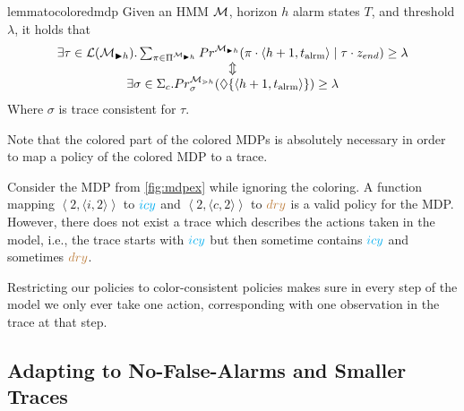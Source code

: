 \documentclass[runningheads]{llncs}
\newcommand{\talrm}{t_{\text{alrm}}}
\newcommand{\icy}{{\color{cyan} icy}\xspace}
\newcommand{\dry}{{\color{brown} dry}\xspace}
\newcommand{\en}{z_{\color{black} end}\xspace}
\newcommand{\alarms}[1][h+1]{\left\langle #1, \talrm\right\rangle}
\newcommand{\ccSched}{\Sigma_c}
\begin{document}
\begin{restatable}{lemma}{tocoloredmdp}
    \label{lem:tocoloredmdp}
    Given an HMM $\mathcal{M}$, horizon $h$ alarm states $T$, and threshold $\lambda$, it holds that
    \vspace{-.1cm}
    \[
        \begin{array}{c}
            \exists \tau \in \lang{\mc_{\blacktriangleright h}}. \sum_{\pi\in\Pi^{\mc_{\blacktriangleright h}}}\Prob^{\mc_{\blacktriangleright h}}(\pi \cdot \alarms \mid \tau \cdot \en) \geq \lambda \\
            \Updownarrow                                                                                                                                                                               \\
            \exists \sigma \in \ccSched.  \Prob^{\mdp_{\gtrdot h}}_{\sigma}(\lozenge \{\alarms\}) \geq \lambda
        \end{array}
    \]
    Where $\sigma$ is trace consistent for $\tau$.
\end{restatable}

Note that the colored part of the colored MDPs is absolutely necessary in order to map a policy of the colored MDP to a trace.
\begin{example}
    Consider the MDP from \cref{fig:mdpex} while ignoring the coloring. A function mapping $\left\langle 2, \langle i,2\rangle \right\rangle$ to $\icy$ and $\left\langle 2, \langle c,2\rangle \right\rangle$ to $\dry$ is a valid policy for the MDP. However, there does not exist a trace which describes the actions taken in the model, i.e., the trace starts with $\icy$ but then sometime contains $\icy$ and sometimes $\dry$.
\end{example}
Restricting our policies to color-consistent policies makes sure in every step of the model we only ever take one action, corresponding with one observation in the trace at that step.


\subsection{Adapting to No-False-Alarms and Smaller Traces}\label{ssec:nfa}
\end{document}
